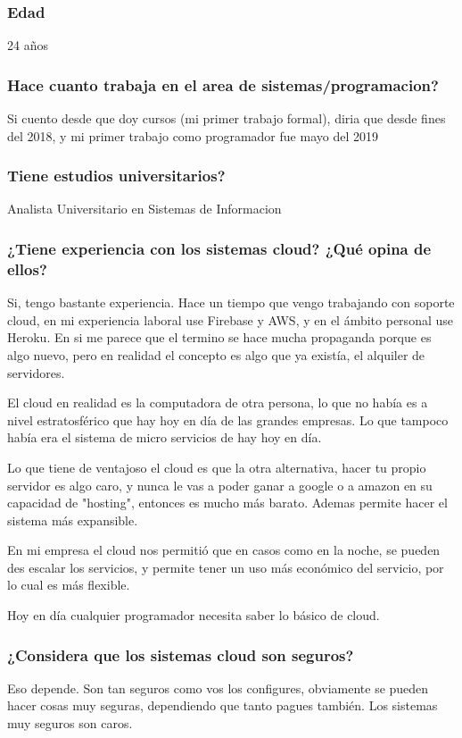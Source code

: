 \documentclass{article}
\begin{document}
\subsubsection{Edad}
24 años

\subsubsection{Hace cuanto trabaja en el area de sistemas/programacion?}
Si cuento desde que doy cursos (mi primer trabajo formal), diria que desde fines del 2018, y mi primer trabajo como programador fue mayo del 2019

\subsubsection{Tiene estudios universitarios?}
Analista Universitario en Sistemas de Informacion

\subsubsection{¿Tiene experiencia con los sistemas cloud? ¿Qué opina de ellos?}
Si, tengo bastante experiencia. Hace un tiempo que vengo trabajando con soporte cloud, en mi experiencia laboral use Firebase y AWS, y en el ámbito personal use Heroku. En si me parece que el termino se hace mucha propaganda porque es algo nuevo, pero en realidad el concepto es algo que ya existía, el alquiler de servidores.

El cloud en realidad es la computadora de otra persona, lo que no había es a nivel estratosférico que hay hoy en día de las grandes empresas. Lo que tampoco había era el sistema de micro servicios de hay hoy en día.

Lo que tiene de ventajoso el cloud es que la otra alternativa, hacer tu propio servidor es algo caro, y nunca le vas a poder ganar a google o a amazon en su capacidad de "hosting", entonces es mucho más barato. Ademas permite hacer el sistema más expansible.

En mi empresa el cloud nos permitió que en casos como en la noche, se pueden des escalar los servicios, y permite tener un uso más económico del servicio, por lo cual es más flexible.

Hoy en día cualquier programador necesita saber lo básico de cloud.

\subsubsection{¿Considera que los sistemas cloud son seguros?}
Eso depende. Son tan seguros como vos los configures, obviamente se pueden hacer cosas muy seguras, dependiendo que tanto pagues también. Los sistemas muy seguros son caros.
\end{document}
